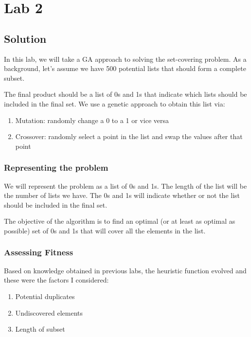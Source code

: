 
\section{Lab 2}

\subsection{Solution}

In this lab, we will take a GA approach to solving the set-covering problem. As a background, let's assume we have 500 potential lists that should form a complete subset.

The final product should be a list of 0s and 1s that indicate which lists should be included in the final set. We use a genetic approach to obtain this list via:

\begin{enumerate}
  \item Mutation: randomly change a 0 to a 1 or vice versa
  \item Crossover: randomly select a point in the list and swap the values after that point
\end{enumerate}

\subsubsection{Representing the problem}
We will represent the problem as a list of 0s and 1s. The length of the list will be the number of lists we have. The 0s and 1s will indicate whether or not the list should be included in the final set.

The objective of the algorithm is to find an optimal (or at least as optimal as possible) set of 0s and 1s that will cover all the elements in the list.

\subsubsection{Assessing Fitness}

Based on knowledge obtained in previous labs, the heuristic function evolved and these were the factors I considered:

\begin{enumerate}
  \item Potential duplicates
  \item Undiscovered elements
  \item Length of subset
\end{enumerate}

